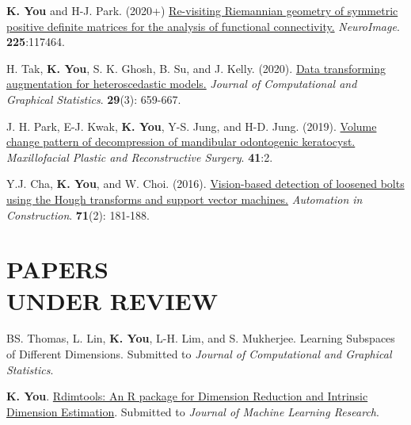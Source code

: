 \documentclass[margin, 10pt]{res} %
\begin{document}
\begin{resume}
\begin{enumerate}[label={[\arabic*]}]
	\item {\bf K. You} and H-J. Park. (2020+) \href{https://doi.org/10.1016/j.neuroimage.2020.117464}{Re-visiting Riemannian geometry of symmetric positive definite matrices for the analysis of functional connectivity.} \textit{NeuroImage}. {\bf 225}:117464.
	\item H. Tak, {\bf K. You}, S. K. Ghosh, B. Su, and J. Kelly. (2020). \href{https://doi.org/10.1080/10618600.2019.1704295}{Data transforming augmentation for heteroscedastic models.} {\it Journal of Computational and Graphical Statistics}. {\bf 29}(3): 659-667. 
	\item J. H. Park, E-J. Kwak, {\bf K. You}, Y-S. Jung, and H-D. Jung. (2019).
	\href{https://rdcu.be/bfKR8}{Volume change pattern of decompression of mandibular odontogenic keratocyst.} {\it Maxillofacial Plastic and Reconstructive Surgery}. {\bf 41}:2.	
	\item Y.J. Cha, {\bf K. You}, and W. Choi. (2016). \href{https://doi.org/10.1016/j.autcon.2016.06.008}{Vision-based detection of loosened bolts using the Hough transforms and support vector machines.} {\it Automation in Construction}. {\bf 71}(2): 181-188.
\end{enumerate}
\vspace{.2cm}


\section{\sf PAPERS \\ UNDER REVIEW} 

\begin{enumerate}[label={[\roman*]}] 
	\item BS. Thomas, L. Lin, \textbf{K. You}, L-H. Lim, and S. Mukherjee. Learning Subspaces of Different Dimensions. Submitted to \textit{Journal of Computational and Graphical Statistics}.
	\item \textbf{K. You}. \href{https://arxiv.org/abs/2005.11107}{Rdimtools: An R package for Dimension Reduction and Intrinsic Dimension Estimation}. Submitted to \textit{Journal of Machine Learning Research}.
\end{enumerate}
\vspace{.2cm}



\end{resume}
\end{document}
